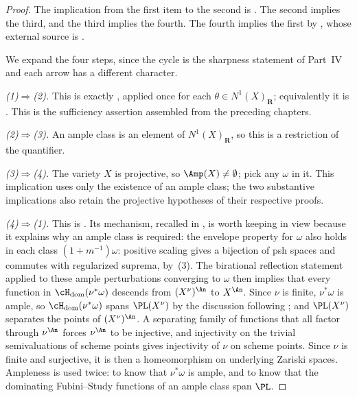 \begin{proof}
The implication from the first item to the second is
.
The second implies the third, and the third implies the fourth.
The fourth implies the first by
, whose external source is
\cite[Theorem~5.12]{BJ22}.

We expand the four steps, since the cycle is the sharpness statement of
Part~IV and each arrow has a different character.

\emph{(1)$\Rightarrow$(2).}  This is exactly
, applied once for each
$\theta\in N^1(X)_{\mathbf R}$; equivalently it is
.  This is the sufficiency assertion assembled
from the preceding chapters.

\emph{(2)$\Rightarrow$(3).}  An ample class is an element of
$N^1(X)_{\mathbf R}$, so this is a restriction of the quantifier.

\emph{(3)$\Rightarrow$(4).}  The variety $X$ is projective, so
$\Amp(X)\ne\emptyset$; pick any $\omega$ in it.  This implication uses
only the existence of an ample class; the two substantive implications also
retain the projective hypotheses of their respective proofs.

\emph{(4)$\Rightarrow$(1).}  This is .
Its mechanism, recalled in , is worth keeping
in view because it explains why an ample class is required: the envelope
property for $\omega$ also holds in each class $(1+m^{-1})\omega$:
positive scaling gives a bijection of psh spaces and commutes with
regularized suprema, by \,(3).
The birational reflection statement
\cite[Lemma~5.13]{BJ22} applied to these ample perturbations converging to
$\omega$ then implies that every function in
$\cH_{\mathrm{dom}}(\nu^*\omega)$ descends from
$(X^\nu)^{\An}$ to $X^{\An}$.  Since $\nu$ is finite, $\nu^*\omega$
is ample, so $\cH_{\mathrm{dom}}(\nu^*\omega)$ spans $\PL(X^\nu)$ by the
discussion following ; and $\PL(X^\nu)$ separates the
points of $(X^\nu)^{\An}$.  A separating family of functions that all
factor through $\nu^{\An}$ forces $\nu^{\An}$ to be injective, and
injectivity on the trivial semivaluations of scheme points gives
injectivity of $\nu$ on scheme points.  Since $\nu$ is finite and
surjective, it is then a homeomorphism on underlying Zariski spaces.  Ampleness is
used twice: to know that $\nu^*\omega$ is ample, and to know that the
dominating Fubini--Study functions of an ample class span $\PL$.
\end{proof}


